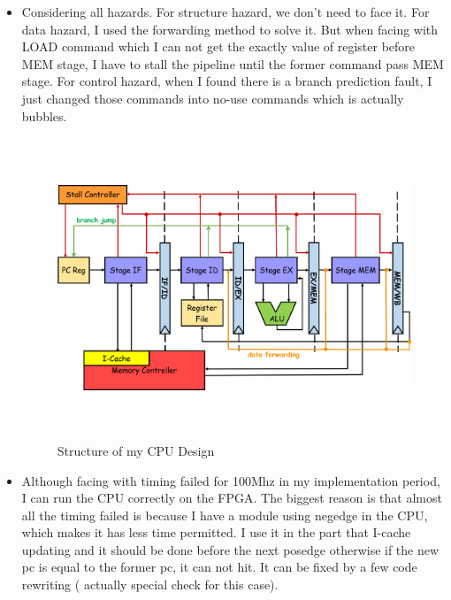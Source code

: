 \documentclass[12pt, a4paper]{article}
\theoremstyle{margin}
\begin{document}
\begin{itemize}
\item Considering all hazards. For structure hazard, we don't need to face it. For data hazard, I used the forwarding method to solve it. But when facing with LOAD command which I can not get the exactly value of register before MEM stage, I have to stall the pipeline until the former command pass MEM stage. For control hazard, when I found there is a branch prediction fault, I just changed those commands into no-use commands which is actually bubbles.

\begin{figure}[H]
	\begin{center}
	  \includegraphics[height=9cm]{structure.png}
	\end{center}
	\caption{Structure of my CPU Design}
\end{figure}





    \item Although facing with timing failed for 100Mhz in my implementation period, I can run the CPU correctly on the FPGA. The biggest reason is that almost all the timing failed is because I have a module using negedge in the CPU, which makes it has less time permitted. I use it in the part that I-cache updating and it should be done before the next posedge otherwise if the new pc is equal to the former pc, it can not hit. It can be fixed by a few code rewriting ( actually special check for this case).
\end{itemize}
\end{document}
